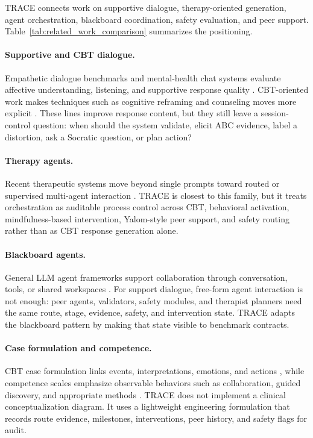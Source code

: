 TRACE connects work on supportive dialogue, therapy-oriented generation, agent orchestration, blackboard coordination, safety evaluation, and peer support. Table~\ref{tab:related_work_comparison} summarizes the positioning.

\paragraph{Supportive and CBT dialogue.}
Empathetic dialogue benchmarks and mental-health chat systems evaluate affective understanding, listening, and supportive response quality \citep{rashkin2019towards,Chen2023SoulChat}. CBT-oriented work makes techniques such as cognitive reframing and counseling moves more explicit \citep{Sharma2023CognitiveReframing,Lee2024Cactus}. These lines improve response content, but they still leave a session-control question: when should the system validate, elicit ABC evidence, label a distortion, ask a Socratic question, or plan action?

\paragraph{Therapy agents.}
Recent therapeutic systems move beyond single prompts toward routed or supervised multi-agent interaction \citep{Xu2025AutoCBT,Liu2026CCDCBT,Elahimanesh2026StructureMatters}. TRACE is closest to this family, but it treats orchestration as auditable process control across CBT, behavioral activation, mindfulness-based intervention, Yalom-style peer support, and safety routing rather than as CBT response generation alone.

\paragraph{Blackboard agents.}
General LLM agent frameworks support collaboration through conversation, tools, or shared workspaces \citep{Wu2023AutoGen,Salemi2025BlackboardSystem}. For support dialogue, free-form agent interaction is not enough: peer agents, validators, safety modules, and therapist planners need the same route, stage, evidence, safety, and intervention state. TRACE adapts the blackboard pattern by making that state visible to benchmark contracts.

\paragraph{Case formulation and competence.}
CBT case formulation links events, interpretations, emotions, and actions \citep{beck1979cognitive}, while competence scales emphasize observable behaviors such as collaboration, guided discovery, and appropriate methods \citep{Blackburn2001CTSR}. TRACE does not implement a clinical conceptualization diagram. It uses a lightweight engineering formulation that records route evidence, milestones, interventions, peer history, and safety flags for audit.

